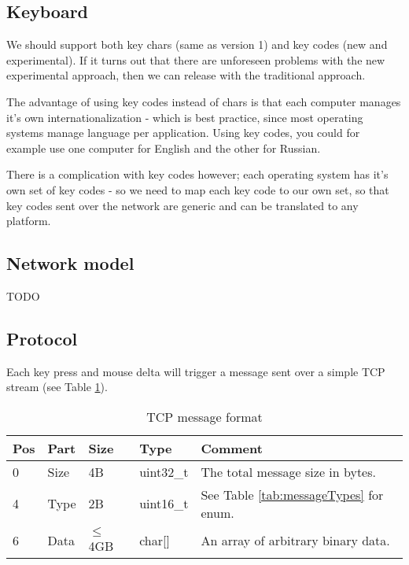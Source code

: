 \subsection{Keyboard}

We should support both key chars (same as version 1) and key codes (new and
experimental). If it turns out that there are unforeseen problems with the
new experimental approach, then we can release with the traditional approach.

The advantage of using key codes instead of chars is that each computer manages
it's own internationalization - which is best practice, since most operating
systems manage language per application. Using key codes, you could for example 
use one computer for English and the other for Russian.

There is a complication with key codes however; each operating system has it's
own set of key codes - so we need to map each key code to our own set, so that
key codes sent over the network are generic and can be translated to any 
platform.

\subsection{Network model}

TODO



\subsection{Protocol}




Each key press and mouse delta will trigger a message sent over a simple TCP 
stream (see Table \ref{tab:messageFormat}).

\begin{table}
  \begin{tabular}{|l|l|l|l|l|}
    \hline
    \textbf{Pos} &
    \textbf{Part} &
    \textbf{Size} &
    \textbf{Type} &
    \textbf{Comment} \\
    \hline
    0 & Size & 4B & uint32\_t & The total message size in bytes. \\
    4 & Type & 2B & uint16\_t & See Table \ref{tab:messageTypes} for enum. \\
    6 & Data & $\leq$4GB & char[] & An array of arbitrary binary data. \\
    \hline
  \end{tabular}
  \caption{TCP message format}
  \label{tab:messageFormat}
\end{table}

